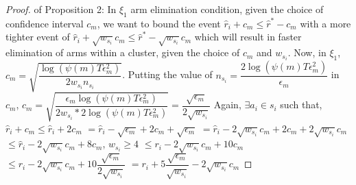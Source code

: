 \begin{proof} of Proposition 2:
\newline In $\xi_{1}$ arm elimination condition, given the choice of confidence interval $c_{m}$, we want to bound the event $\hat{r}_{i}+c_{m}\leq \hat{r}^{*}-c_{m}$ with a more tighter event of $ \hat{r}_{i} + \sqrt{w_{s_{i}}}c_{m} \leq \hat{r}^{*} - \sqrt{w_{s_{i}}}c_{m}$ which will result in faster elimination of arms within a cluster, given the choice of $c_{m}$ and $w_{s_{i}}$.
\newline Now, in $\xi_{1}$, $c_{m}=\sqrt{\dfrac{\log (\psi(m)T\epsilon_{m}^{2})}{2w_{s_{i}} n_{s_{i}}}}$.
\newline Putting the value of $n_{s_{i}}=\dfrac{2\log{(\psi(m)T\epsilon_{m}^{2})}}{\epsilon_{m}}$ in $c_{m}$,
\newline $c_{m}=\sqrt{\dfrac{\epsilon_{m}\log (\psi(m)T\epsilon_{m}^{2})}{2w_{s_{i}}*2 \log(\psi(m)T\epsilon_{m}^{2})}}=\dfrac{\sqrt{\epsilon_{m}}}{2\sqrt{w_{s_{i}}}}$
\newline Again, $\exists a_{i} \in s_{i}$ such that, 
$\hat{r}_{i} + c_{m}\leq\hat{r}_{i} + 2c_{m} $
\newline\hspace*{14em}$= \hat{r}_{i}-\sqrt{\epsilon_{m}} + 2c_{m} +\sqrt{\epsilon_{m}}$
\newline\hspace*{14em}$= \hat{r}_{i}-2\sqrt{w_{s_{i}}}c_{m} + 2c_{m} +2\sqrt{w_{s_{i}}}c_{m}$
\newline\hspace*{14em}$\leq \hat{r}_{i} - 2\sqrt{w_{s_{i}}}c_{m}+ 8c_{m}$, $w_{s_{i}}\geq 4$
\newline\hspace*{14em}$\leq r_{i} -2\sqrt{w_{s_{i}}}c_{m} + 10c_{m}$
\newline\hspace*{14em}$\leq r_{i} - 2\sqrt{w_{s_{i}}}c_{m} + 10\dfrac{\sqrt{\epsilon_{m}}}{2\sqrt{w_{s_{i}}}} $
\newline\hspace*{14em}$= r_{i} + 5\dfrac{\sqrt{\epsilon_{m}}}{\sqrt{w_{s_{i}}}} - 2\sqrt{w_{s_{i}}}c_{m}$

\end{proof}
